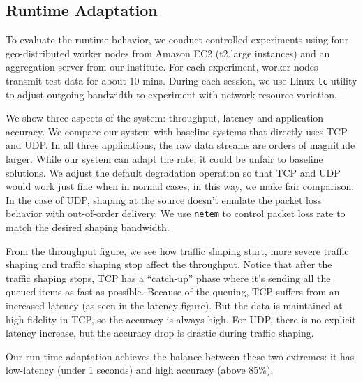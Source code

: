 \subsection{Runtime Adaptation}
\label{sec:runtime-adaptation}

To evaluate the runtime behavior, we conduct controlled experiments using four
geo-distributed worker nodes from Amazon EC2 (t2.large instances) and an
aggregation server from our institute. For each experiment, worker nodes
transmit test data for about 10 mins. During each session, we use Linux
\texttt{tc} utility to adjust outgoing bandwidth to experiment with network
resource variation.

We show three aspects of the system: throughput, latency and application
accuracy. We compare our system with baseline systems that directly uses TCP and
UDP. In all three applications, the raw data streams are orders of magnitude
larger. While our system can adapt the rate, it could be unfair to baseline
solutions. We adjust the default degradation operation so that TCP and UDP would
work just fine when in normal cases; in this way, we make fair comparison. In
the case of UDP, shaping at the source doesn't emulate the packet loss behavior
with out-of-order delivery. We use \texttt{netem} to control packet loss rate to
match the desired shaping bandwidth.

From the throughput figure, we see how traffic shaping start, more severe
traffic shaping and traffic shaping stop affect the throughput. Notice that
after the traffic shaping stops, TCP has a ``catch-up'' phase where it's sending
all the queued items as fast as possible. Because of the queuing, TCP suffers
from an increased latency (as seen in the latency figure). But the data is
maintained at high fidelity in TCP, so the accuracy is always high. For UDP,
there is no explicit latency increase, but the accuracy drop is drastic during
traffic shaping.

Our run time adaptation achieves the balance between these two extremes: it has
low-latency (under 1 seconds) and high accuracy (above 85\%).

